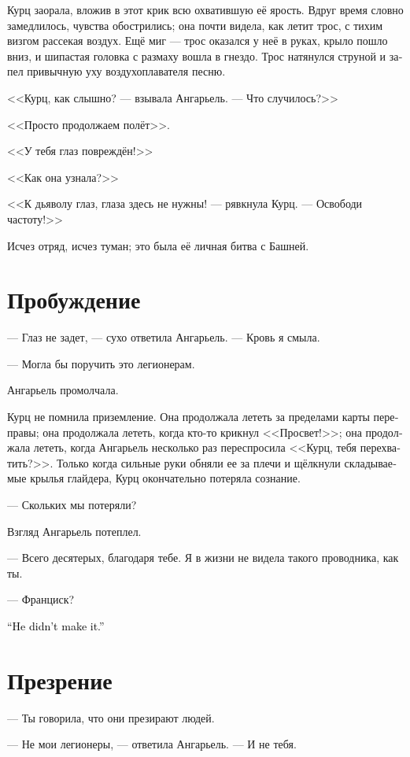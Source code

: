 \documentclass[a4paper,12pt,fleqn]{book}\usepackage{cooltooltips}\usepackage{polyglossia}\setdefaultlanguage[babelshorthands=true]{russian}\setotherlanguage{english}\defaultfontfeatures{Ligatures=TeX,Mapping=tex-text} \usepackage{xcolor}\definecolor{lightgray}{HTML}{bbbbbb}\color{lightgray}\newcommand{\ml}[3]{\textenglish{\textcolor{black}{#3}}}
\begin{document}
Курц заорала, вложив в этот крик всю охватившую её ярость.
Вдруг время словно замедлилось, чувства обострились;
она почти видела, как летит трос, с тихим визгом рассекая воздух.
Ещё миг --- трос оказался у неё в руках, крыло пошло вниз, и шипастая головка с размаху вошла в гнездо.
Трос натянулся струной и запел привычную уху воздухоплавателя песню.

<<Курц, как слышно? --- взывала Ангарьель.
--- Что случилось?>>

<<Просто продолжаем полёт>>.

<<У тебя глаз повреждён!>>

<<Как она узнала?>>

<<К дьяволу глаз, глаза здесь не нужны! --- рявкнула Курц.
--- Освободи частоту!>>

Исчез отряд, исчез туман;
это была её личная битва с Башней.

\section{Пробуждение}

--- Глаз не задет, --- сухо ответила Ангарьель.
--- Кровь я смыла.

--- Могла бы поручить это легионерам.

Ангарьель промолчала.

Курц не помнила приземление.
Она продолжала лететь за пределами карты переправы;
она продолжала лететь, когда кто-то крикнул <<Просвет!>>;
она продолжала лететь, когда Ангарьель несколько раз переспросила <<Курц, тебя перехватить?>>.
Только когда сильные руки обняли ее за плечи и щёлкнули складываемые крылья глайдера, Курц окончательно потеряла сознание.

--- Скольких мы потеряли?

Взгляд Ангарьель потеплел.

--- Всего десятерых, благодаря тебе.
Я в жизни не видела такого проводника, как ты.

--- Франциск?

\ml{$0$}
{--- Он не выбрался.}
{``He didn't make it.''}

\section{Презрение}

--- Ты говорила, что они презирают людей.

--- Не мои легионеры, --- ответила Ангарьель.
--- И не тебя.
\end{document}
